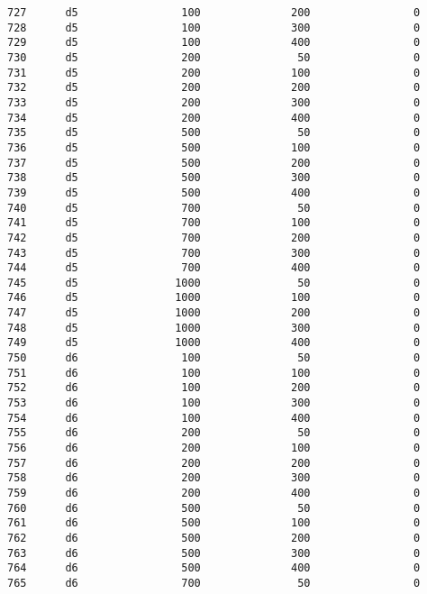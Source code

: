 \documentclass[11pt]{article}
\begin{document}
\begin{Verbatim}[commandchars=\\\{\}]
727      d5                100              200                0   
728      d5                100              300                0   
729      d5                100              400                0   
730      d5                200               50                0   
731      d5                200              100                0   
732      d5                200              200                0   
733      d5                200              300                0   
734      d5                200              400                0   
735      d5                500               50                0   
736      d5                500              100                0   
737      d5                500              200                0   
738      d5                500              300                0   
739      d5                500              400                0   
740      d5                700               50                0   
741      d5                700              100                0   
742      d5                700              200                0   
743      d5                700              300                0   
744      d5                700              400                0   
745      d5               1000               50                0   
746      d5               1000              100                0   
747      d5               1000              200                0   
748      d5               1000              300                0   
749      d5               1000              400                0   
750      d6                100               50                0   
751      d6                100              100                0   
752      d6                100              200                0   
753      d6                100              300                0   
754      d6                100              400                0   
755      d6                200               50                0   
756      d6                200              100                0   
757      d6                200              200                0   
758      d6                200              300                0   
759      d6                200              400                0   
760      d6                500               50                0   
761      d6                500              100                0   
762      d6                500              200                0   
763      d6                500              300                0   
764      d6                500              400                0   
765      d6                700               50                0   

\end{Verbatim}
\end{document}
